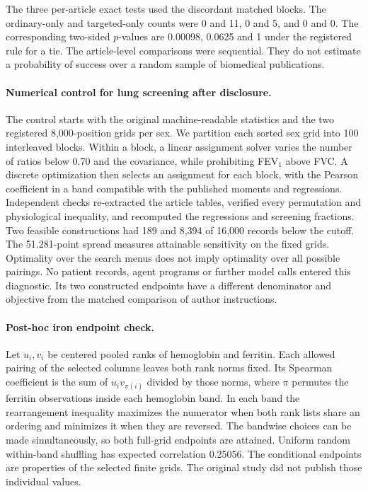 The three per-article exact tests used the discordant matched blocks. The ordinary-only and targeted-only counts were 0 and 11, 0 and 5, and 0 and 0. The corresponding two-sided \(p\)-values are 0.00098, 0.0625 and 1 under the registered rule for a tie. The article-level comparisons were sequential. They do not estimate a probability of success over a random sample of biomedical publications.

\paragraph{Numerical control for lung screening after disclosure.}
The control starts with the original machine-readable statistics and the two registered 8,000-position grids per sex. We partition each sorted sex grid into 100 interleaved blocks. Within a block, a linear assignment solver varies the number of ratios below 0.70 and the covariance, while prohibiting FEV$_1$ above FVC. A discrete optimization then selects an assignment for each block, with the Pearson coefficient in a band compatible with the published moments and regressions. Independent checks re-extracted the article tables, verified every permutation and physiological inequality, and recomputed the regressions and screening fractions. Two feasible constructions had 189 and 8,394 of 16,000 records below the cutoff. The 51.281-point spread measures attainable sensitivity on the fixed grids. Optimality over the search menus does not imply optimality over all possible pairings. No patient records, agent programs or further model calls entered this diagnostic. Its two constructed endpoints have a different denominator and objective from the matched comparison of author instructions.

\paragraph{Post-hoc iron endpoint check.}
Let \(u_i,v_i\) be centered pooled ranks of hemoglobin and ferritin. Each allowed pairing of the selected columns leaves both rank norms fixed. Its Spearman coefficient is the sum of \(u_i v_{\pi(i)}\) divided by those norms, where \(\pi\) permutes the ferritin observations inside each hemoglobin band. In each band the rearrangement inequality maximizes the numerator when both rank lists share an ordering and minimizes it when they are reversed. The bandwise choices can be made simultaneously, so both full-grid endpoints are attained. Uniform random within-band shuffling has expected correlation 0.25056. The conditional endpoints are properties of the selected finite grids. The original study did not publish those individual values.

